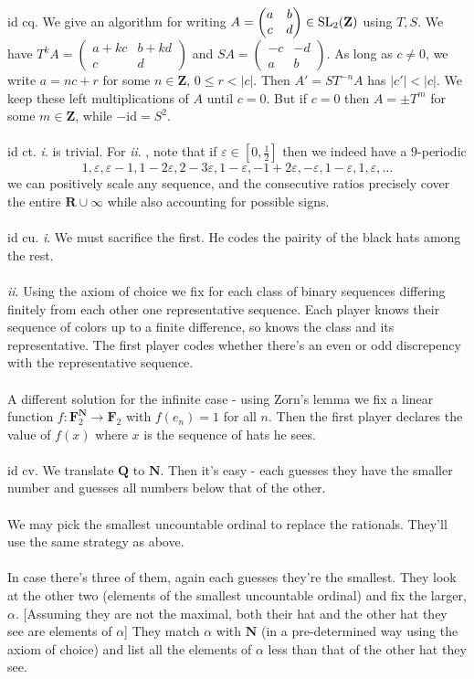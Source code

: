 \documentclass[oneside]{book}
\newcommand{\eps}{\varepsilon}
\newcommand{\Z}{\mathbf{Z}}
\newcommand{\F}{\mathbf{F}}
\newcommand{\N}{\mathbf{N}}
\newcommand{\R}{\mathbf{R}}
\newcommand{\Q}{\mathbf{Q}}
\newcommand{\abs}[1]{\left\lvert #1\right\rvert}
\newcommand{\id}{\mathrm{id}}
\renewcommand{\i}{{\it i}. }
\newcommand{\ii}{{\it ii}. }
\newcommand*\pmat[4]{\begin{pmatrix}#1&#2\\#3&#4\end{pmatrix}}
\begin{document}
id cq. We give an algorithm for writing $A=\pmat{a}{b}{c}{d}\in\SL_2(\Z)$ using $T,S$. We have $T^k A=\pmat{a+kc}{b+kd}{c}{d}$ and $SA=\pmat{-c}{-d}{a}{b}$. As long as $c\neq 0$, we write $a=nc+r$ for some $n\in\Z$, $0\le r<\abs{c}$. Then $A'=ST^{-n}A$ has $\abs{c'}<\abs{c}$. We keep these left multiplications of $A$ until $c=0$. But if $c=0$ then $A=\pm T^m$ for some $m\in\Z$, while $-\id =S^2$.\\\\


id ct. \i is trivial. For \ii, note that if $\eps\in[0,\frac{1}{2}]$ then we indeed have a $9$-periodic $$1,\eps,\eps-1,1-2\eps,2-3\eps,1-\eps,-1+2\eps,-\eps,1-\eps,1,\eps,\dots$$
we can positively scale any sequence, and the consecutive ratios precisely cover the entire $\R\cup\infty$ while also accounting for possible signs.\\\\


id cu. \i We must sacrifice the first. He codes the pairity of the black hats among the rest.\\\\
\ii Using the axiom of choice we fix for each class of binary sequences differing finitely from each other one representative sequence. Each player knows their sequence of colors up to a finite difference, so knows the class and its representative. The first player codes whether there's an even or odd discrepency with the representative sequence.\\\\
A different solution for the infinite case - using Zorn's lemma we fix a linear function $f:\F_2^\N\to\F_2$ with $f(e_n)=1$ for all $n$. Then the first player declares the value of $f(x)$ where $x$ is the sequence of hats he sees.\\\\


id cv. We translate $\Q$ to $\N$. Then it's easy - each guesses they have the smaller number and guesses all numbers below that of the other.\\\\
We may pick the smallest uncountable ordinal to replace the rationals. They'll use the same strategy as above.\\\\
In case there's three of them, again each guesses they're the smallest. They look at the other two (elements of the smallest uncountable ordinal) and fix the larger, $\alpha$. [Assuming they are not the maximal, both their hat and the other hat they see are elements of $\alpha$] They match $\alpha$ with $\N$ (in a pre-determined way using the axiom of choice) and list all the elements of $\alpha$ less than that of the other hat they see.\\\\
\end{document}
